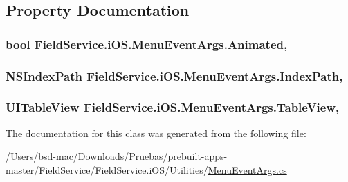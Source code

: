 \subsection{Property Documentation}
\hypertarget{class_field_service_1_1i_o_s_1_1_menu_event_args_ae9b905c7f2c0ace94f121602c4f503e2}{
\subsubsection[{Animated}]{\setlength{\rightskip}{0pt plus 5cm}bool Field\+Service.\+i\+O\+S.\+Menu\+Event\+Args.\+Animated\hspace{0.3cm}{\ttfamily [get]}, {\ttfamily [set]}}}\label{class_field_service_1_1i_o_s_1_1_menu_event_args_ae9b905c7f2c0ace94f121602c4f503e2}
\hypertarget{class_field_service_1_1i_o_s_1_1_menu_event_args_a62d6c1e2192b1717ba25addde3d2efc4}{
\subsubsection[{Index\+Path}]{\setlength{\rightskip}{0pt plus 5cm}N\+S\+Index\+Path Field\+Service.\+i\+O\+S.\+Menu\+Event\+Args.\+Index\+Path\hspace{0.3cm}{\ttfamily [get]}, {\ttfamily [set]}}}\label{class_field_service_1_1i_o_s_1_1_menu_event_args_a62d6c1e2192b1717ba25addde3d2efc4}
\hypertarget{class_field_service_1_1i_o_s_1_1_menu_event_args_af70b20cb3ca66b80acdf7ac311920fe3}{
\subsubsection[{Table\+View}]{\setlength{\rightskip}{0pt plus 5cm}U\+I\+Table\+View Field\+Service.\+i\+O\+S.\+Menu\+Event\+Args.\+Table\+View\hspace{0.3cm}{\ttfamily [get]}, {\ttfamily [set]}}}\label{class_field_service_1_1i_o_s_1_1_menu_event_args_af70b20cb3ca66b80acdf7ac311920fe3}


The documentation for this class was generated from the following file\+:\begin{DoxyCompactItemize}
\item 
/\+Users/bsd-\/mac/\+Downloads/\+Pruebas/prebuilt-\/apps-\/master/\+Field\+Service/\+Field\+Service.\+i\+O\+S/\+Utilities/\hyperlink{_menu_event_args_8cs}{Menu\+Event\+Args.\+cs}\end{DoxyCompactItemize}
